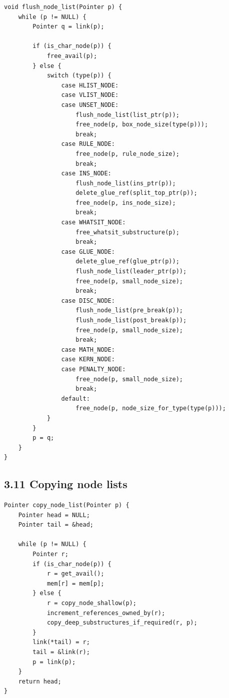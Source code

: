 \documentclass[11pt]{article}
\begin{document}
\begin{verbatim}
void flush_node_list(Pointer p) {
    while (p != NULL) {
        Pointer q = link(p);

        if (is_char_node(p)) {
            free_avail(p);
        } else {
            switch (type(p)) {
                case HLIST_NODE:
                case VLIST_NODE:
                case UNSET_NODE:
                    flush_node_list(list_ptr(p));
                    free_node(p, box_node_size(type(p)));
                    break;
                case RULE_NODE:
                    free_node(p, rule_node_size);
                    break;
                case INS_NODE:
                    flush_node_list(ins_ptr(p));
                    delete_glue_ref(split_top_ptr(p));
                    free_node(p, ins_node_size);
                    break;
                case WHATSIT_NODE:
                    free_whatsit_substructure(p);
                    break;
                case GLUE_NODE:
                    delete_glue_ref(glue_ptr(p));
                    flush_node_list(leader_ptr(p));
                    free_node(p, small_node_size);
                    break;
                case DISC_NODE:
                    flush_node_list(pre_break(p));
                    flush_node_list(post_break(p));
                    free_node(p, small_node_size);
                    break;
                case MATH_NODE:
                case KERN_NODE:
                case PENALTY_NODE:
                    free_node(p, small_node_size);
                    break;
                default:
                    free_node(p, node_size_for_type(type(p)));
            }
        }
        p = q;
    }
}
\end{verbatim}

\subsection{3.11 Copying node lists}\label{copying-node-lists}

\begin{verbatim}
Pointer copy_node_list(Pointer p) {
    Pointer head = NULL;
    Pointer tail = &head;

    while (p != NULL) {
        Pointer r;
        if (is_char_node(p)) {
            r = get_avail();
            mem[r] = mem[p];
        } else {
            r = copy_node_shallow(p);
            increment_references_owned_by(r);
            copy_deep_substructures_if_required(r, p);
        }
        link(*tail) = r;
        tail = &link(r);
        p = link(p);
    }
    return head;
}
\end{verbatim}
\end{document}
